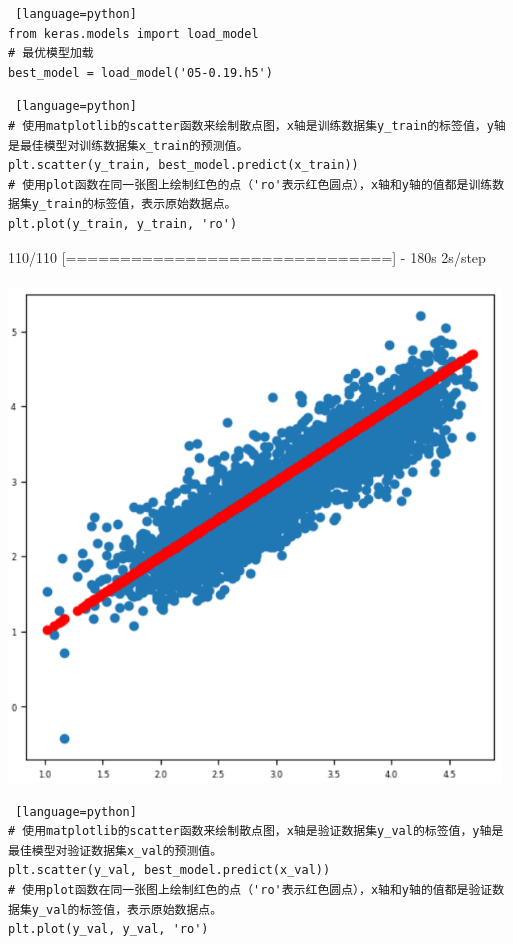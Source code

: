 \documentclass{article}
\begin{document}
\begin{lstlisting} [language=python]
from keras.models import load_model
# 最优模型加载
best_model = load_model('05-0.19.h5')
\end{lstlisting}
\begin{lstlisting} [language=python]
# 使用matplotlib的scatter函数来绘制散点图，x轴是训练数据集y_train的标签值，y轴是最佳模型对训练数据集x_train的预测值。  
plt.scatter(y_train, best_model.predict(x_train))  
# 使用plot函数在同一张图上绘制红色的点（'ro'表示红色圆点），x轴和y轴的值都是训练数据集y_train的标签值，表示原始数据点。  
plt.plot(y_train, y_train, 'ro')
\end{lstlisting}
110/110 [==============================] - 180s 2s/step\\
[<matplotlib.lines.Line2D at 0x1b6ddd40590>]\\
\includegraphics[width=0.98\textwidth]{4.png}\\
\begin{lstlisting} [language=python]
# 使用matplotlib的scatter函数来绘制散点图，x轴是验证数据集y_val的标签值，y轴是最佳模型对验证数据集x_val的预测值。  
plt.scatter(y_val, best_model.predict(x_val))  
# 使用plot函数在同一张图上绘制红色的点（'ro'表示红色圆点），x轴和y轴的值都是验证数据集y_val的标签值，表示原始数据点。  
plt.plot(y_val, y_val, 'ro')
\end{lstlisting}
\end{document}
